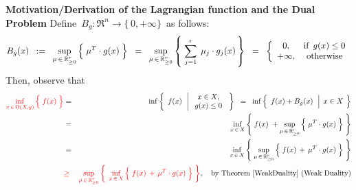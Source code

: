 \vskip 0.3cm
\noindent
\textbf{Motivation/Derivation of the Lagrangian function and the Dual Problem}
\vskip 0.2cm
\noindent
Define \,$B_{g} : \Re^{n} \longrightarrow \{\,0,+\infty\}$\, as follows:
\begin{equation*}
B_{g}(x)
\;\; := \;\;
	\underset{\mu\,\in\,\Re_{\geq 0}^{r}}{\sup}
	\left\{\;
		\mu^{T} \cdot \overset{{\color{white}.}}{g(x)}
		\;\right\}
\;\; = \;\;
	\underset{\mu\,\in\,\Re_{\geq 0}^{r}}{\sup}
	\left\{\;
		\overset{r}{\underset{j=1}{\sum}}\;\,\mu_{j} \cdot \overset{{\color{white}.}}{g_{j}(x)}
		\,\right\}
\;\; = \;\;
	\left\{\begin{array}{cc}
		0, & \textnormal{if \,$g(x) \leq 0$}
		\\
		+\infty, & \textnormal{otherwise}
		\end{array}\right.
\end{equation*}
Then, observe that
\begin{eqnarray*}
{\color{red}\underset{x\,\in\,\Omega(X,g)}{\inf}\left\{\;
	\overset{{\color{white}.}}{f(x)}
	\;\right\}}
& = &
	\inf
	\left\{\;\,
		\overset{{\color{white}.}}{f(x)}
		\,\;\left\vert\;
		\begin{array}{c}
			x \in X,
			\\
			g(x) \leq 0
			\end{array}
			\right.
		\;\right\}
\;\; = \;\;
	\inf
	\left\{\;\,
		\overset{{\color{white}.}}{f(x)} + B_{g}(x)
		\,\;\left\vert\;\,
			\overset{{\color{white}1}}{x} \in X
			\right.
		\;\right\}
\\
& = &
	\underset{x\,\in\,X}{\inf}
	\left\{\;
		\overset{{\color{white}.}}{f(x)}
		\; +  
		\underset{\mu\,\in\,\Re_{\geq 0}^{r}}{\sup}
			\left\{\;
			\mu^{T} \cdot \overset{{\color{white}.}}{g(x)}
			\;\right\}
		\;\right\}
\\
& = &
	\underset{x\,\in\,X}{\inf}
	\left\{\;
		 \underset{\mu\,\in\,\Re_{\geq 0}^{r}}{\sup}
			\left\{\;
			\overset{{\color{white}.}}{f(x)}
			\, + \,
			\mu^{T} \cdot \overset{{\color{white}.}}{g(x)}
			\;\right\}
		\;\right\}
\\
& {\color{red}\geq} &
	{\color{red}\underset{\mu\,\in\,\Re_{\geq 0}^{r}}{\sup}
	\left\{\;\,
		\underset{x\,\in\,X}{\inf}
			\left\{\;
			\overset{{\color{white}.}}{f(x)}
			\, + \,
			\mu^{T} \cdot \overset{{\color{white}.}}{g(x)}
			\;\right\}
		\;\right\}},
		\quad
		\textnormal{by Theorem \ref{WeakDuality} (Weak Duality)}
\end{eqnarray*}


